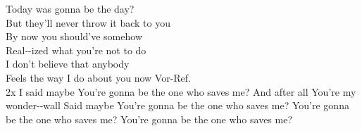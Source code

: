 \begin{enumerate}
\verse {} Today was  gonna be the day? \\ 
But they’ll never  throw it back to  you \\ 
 By now you  should’ve somehow \\ 
Real--ized what you’re not to  do \\ 
 I don’t believe that  anybody \\ 
 Feels the way I  do about you  now  
Vor-Ref. \\ 
2x  I said  maybe  
 You’re gonna be the one who  saves me?  
And  after  all 
 You’re my  wonder--wall   
 Said  maybe  
 You’re gonna be the one who  saves me?  
 You’re gonna be the one who  saves me?  
 You’re gonna be the one who  saves me?  

\end{enumerate}